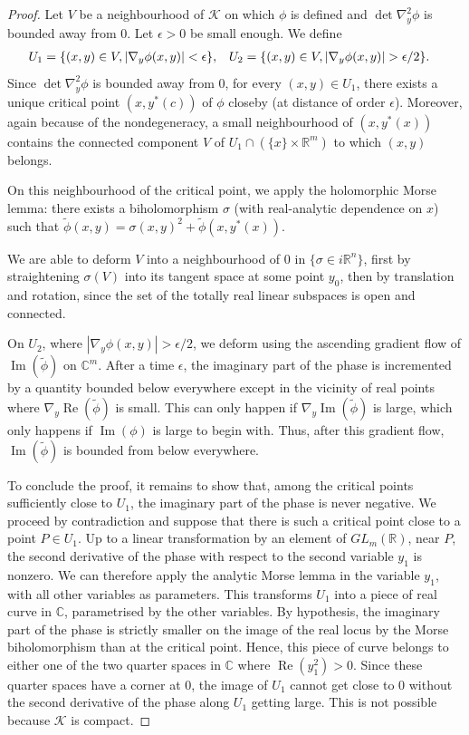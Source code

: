 \documentclass[10pt]{amsart}
\theoremstyle{definition}\newtheorem{defi}[theo]{Definition}\newtheorem{rema}[theo]{Remark}\newtheorem{exam}[theo]{Example}\newtheorem{exem}[theo]{Example}\newtheorem{nota}[theo]{Notation}
\DeclareMathOperator{\re}{Re}
\DeclareMathOperator{\im}{Im}
\newcommand{\clK}{\mathcal{K}}
\newcommand\1{\mathds{1}}
\newcommand{\R}{\mathbb{R}}
\newcommand{\C}{\mathbb{C}}
\let\originalleft\left
\let\originalright\right
\renewcommand{\left}{\mathopen{}\mathclose\bgroup\originalleft}
\renewcommand{\right}{\aftergroup\egroup\originalright}
\begin{document}
\begin{proof}
Let $V$ be a neighbourhood of $\clK$ on which $\phi$ is defined and $\det\nabla^2_y\phi$ is bounded away from $0$. Let $\epsilon>0$ be small enough. We define
\begin{align*}
&U_1=\left\{(x,y)\in V, |\nabla_y\phi(x,y)|< \epsilon \right\},& &U_2= \left\{(x,y)\in V, |\nabla_y\phi(x,y)|> \epsilon/2\right\}.
\end{align*}
Since $\det\nabla^2_y\phi$ is bounded away from $0$, for every $(x,y)\in U_1$, there exists a unique critical point $(x,y^*(c))$ of $\phi$ closeby (at distance of order $\epsilon$). Moreover, again because of the nondegeneracy, a small neighbourhood of $(x,y^*(x))$ contains the connected component $V$ of $U_1\cap (\{x\}\times \R^m)$ to which $(x,y)$ belongs.

On this neighbourhood of the critical point, we apply the holomorphic Morse lemma: there exists a biholomorphism $\sigma$ (with real-analytic dependence on $x$) such that $\widetilde{\phi}(x,y)=\sigma(x,y)^2+\widetilde{\phi}(x,y^*(x))$.

We are able to deform $V$ into a neighbourhood of $0$ in $\{\sigma\in i\R^n\}$, first by straightening $\sigma(V)$ into its tangent space at some point $y_0$, then by translation and rotation, since the set of the totally real linear subspaces is open and connected.

On $U_2$, where $|\nabla_y\phi(x,y)|>\epsilon/2$, we deform using the ascending gradient flow of $\im(\widetilde{\phi})$ on $\C^m$. After a time $\epsilon$, the imaginary part of the phase is incremented by a quantity bounded below everywhere except in the vicinity of real points where $\nabla_y\re(\widetilde{\phi})$ is small. This can only happen if $\nabla_y\im(\widetilde{\phi})$ is large, which only happens if $\im(\phi)$ is large to begin with. Thus, after this gradient flow, $\im(\widetilde{\phi})$ is bounded from below everywhere.

To conclude the proof, it remains to show that, among the critical points sufficiently close to $U_1$, the imaginary part of the phase is never negative. We proceed by contradiction and suppose that there is such a critical point close to a point $P\in U_1$. Up to a linear transformation by an element of $GL_m(\R)$, near $P$, the second derivative of the phase with respect to the second variable $y_1$ is nonzero. We can therefore apply the analytic Morse lemma in the variable $y_1$, with all other variables as parameters. This transforms $U_1$ into a piece of real curve in $\C$, parametrised by the other variables. By hypothesis, the imaginary part of the phase is strictly smaller on the image of the real locus by the Morse biholomorphism than at the critical point. Hence, this piece of curve belongs to either one of the two quarter spaces in $\C$ where $\re(y_1^2)>0$. Since these quarter spaces have a corner at $0$, the image of $U_1$ cannot get close to $0$ without the second derivative of the phase along $U_1$ getting large. This is not possible because $\clK$ is compact.
\end{proof}
\end{document}
